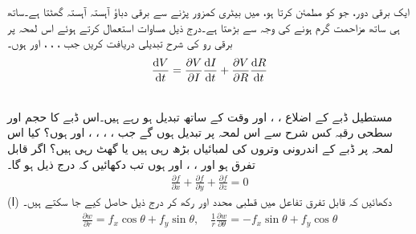 \\
\\
ایک برقی  دور،  جو  کو مطمئن  کرتا ہو،  میں  بیٹری کمزور پڑنے سے برقی دباؤ  آہستہ آہستہ  گھٹتا ہے۔ساتھ ہی ساتھ مزاحمت گرم ہونے کی وجہ سے بڑھتا ہے۔درج ذیل مساوات استعمال کرتے ہوئے اس لمحہ پر برقی رو کی شرح تبدیلی دریافت کریں جب ، ، ،  اور  ہوں۔
\begin{align*}
\frac{\dif V}{\dif t}=\frac{\partial V}{\partial I}\frac{\dif I}{\dif t}+\frac{\partial V}{\partial R}\frac{\dif R}{\dif t}
\end{align*}
\begin{center}
\end{center}
\\
 مستطیل ڈبے کے اضلاع ، ،  اور   وقت کے ساتھ تبدیل ہو رہے ہیں۔اس ڈبے کا   حجم اور  سطحی رقبہ کس شرح سے اس لمحہ  پر تبدیل ہوں  گے  جب ، ، ، ،  اور   ہوں؟ کیا اس لمحہ پر  ڈبے کے اندرونی  وتروں کی لمبائیاں بڑھ رہی ہیں یا گھٹ رہی ہیں؟
اگر  قابل تفرق ہو اور ،  ، اور  ہوں تب دکھائیں کہ درج ذیل ہو گا۔
\begin{align*}
\frac{\partial f}{\partial x}+\frac{\partial f}{\partial y}+\frac{\partial f}{\partial z}=0
\end{align*}
(ا) دکھائیں کہ قابل تفرق تفاعل  میں قطبی محدد  اور    رکھ کر درج ذیل حاصل کیے جا سکتے ہیں۔
\begin{align*}
\frac{\partial w}{\partial r}=f_x\cos\theta+f_y\sin\theta,\quad  \frac{1}{r}\frac{\partial w}{\partial \theta}=-f_x\sin\theta+f_y\cos\theta
\end{align*}
